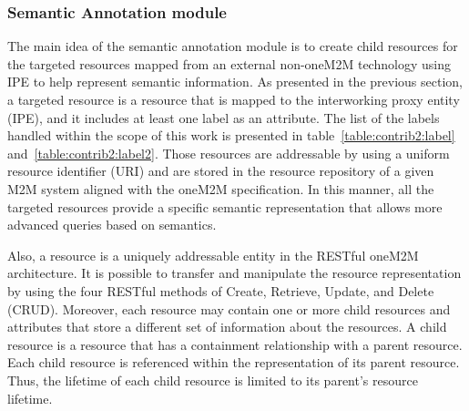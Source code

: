 \subsubsection{Semantic Annotation module}
 The main idea of the semantic annotation module is to create child resources for the targeted resources mapped from an external non-oneM2M technology using IPE to help represent semantic information. As presented in the previous section, a targeted resource is a resource that is mapped to the interworking proxy entity (IPE), and it includes at least one label as an attribute. The list of the labels handled within the scope of this work is presented in table~\ref{table:contrib2:label} and~\ref{table:contrib2:label2}. Those resources are addressable by using a uniform resource identifier (URI) and are stored in the resource repository of a given M2M system aligned with the oneM2M specification. In this manner, all the targeted resources provide a specific semantic representation that allows more advanced queries based on semantics.\par
  Also, a resource is a uniquely addressable entity in the RESTful oneM2M architecture. It is possible to transfer and manipulate the resource representation by using the four RESTful methods of Create, Retrieve, Update, and Delete (CRUD). Moreover, each resource may contain one or more child resources and attributes that store a different set of information about the resources. A child resource is a resource that has a containment relationship with a parent resource. Each child resource is referenced within the representation of its parent resource. Thus, the lifetime of each child resource is limited to its parent’s resource lifetime.\par
{}
